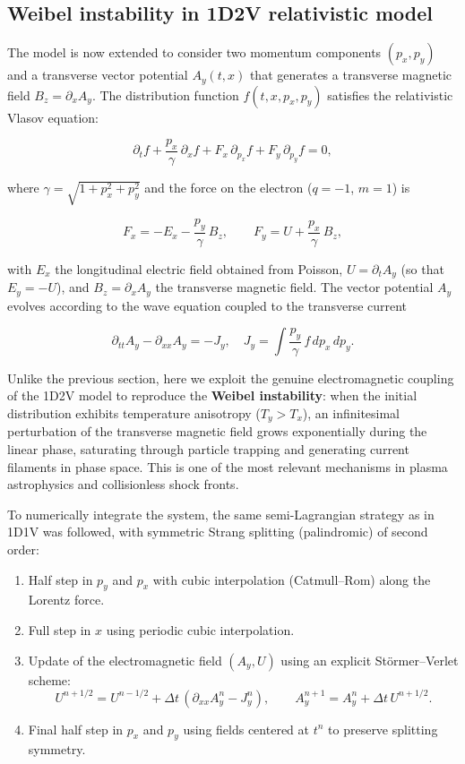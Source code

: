 \documentclass[11pt,a4paper,twoside,pdf]{article}
\numberwithin{equation}{section}
\begin{document}




\subsection{Weibel instability in 1D2V relativistic model}
\label{sec:weibel}

The model is now extended to consider two momentum components $(p_x,p_y)$ and a transverse vector potential $A_y(t,x)$ that generates a transverse magnetic field $B_z = \partial_x A_y$. The distribution function $f(t,x,p_x,p_y)$ satisfies the relativistic Vlasov equation:

\[
\partial_t f + \frac{p_x}{\gamma}\,\partial_x f
+ F_x\,\partial_{p_x} f + F_y\,\partial_{p_y} f = 0,
\]

where $\gamma = \sqrt{1 + p_x^2 + p_y^2}$ and the force on the electron ($q=-1$, $m=1$) is

\[
F_x = -E_x - \frac{p_y}{\gamma}\,B_z, \qquad
F_y = U + \frac{p_x}{\gamma}\,B_z,
\]

with $E_x$ the longitudinal electric field obtained from Poisson, $U = \partial_t A_y$ (so that $E_y = -U$), and $B_z = \partial_x A_y$ the transverse magnetic field. The vector potential $A_y$ evolves according to the wave equation coupled to the transverse current

\[
\partial_{tt} A_y - \partial_{xx} A_y = - J_y,
\quad J_y = \int \frac{p_y}{\gamma}\, f\,dp_x\,dp_y.
\]

Unlike the previous section, here we exploit the genuine electromagnetic coupling of the 1D2V model to reproduce the \textbf{Weibel instability}: when the initial distribution exhibits temperature anisotropy ($T_y > T_x$), an infinitesimal perturbation of the transverse magnetic field grows exponentially during the linear phase, saturating through particle trapping and generating current filaments in phase space. This is one of the most relevant mechanisms in plasma astrophysics and collisionless shock fronts.

To numerically integrate the system, the same semi-Lagrangian strategy as in 1D1V was followed, with symmetric Strang splitting (palindromic) of second order:

\begin{enumerate}
    \item Half step in $p_y$ and $p_x$ with cubic interpolation (Catmull--Rom) along the Lorentz force.
    \item Full step in $x$ using periodic cubic interpolation.
    \item Update of the electromagnetic field $(A_y,U)$ using an explicit Störmer--Verlet scheme:
    \[
    U^{n+1/2} = U^{n-1/2} + \Delta t\,(\partial_{xx}A_y^n - J_y^n),\qquad
    A_y^{n+1} = A_y^n + \Delta t\, U^{n+1/2}.
    \]
    \item Final half step in $p_x$ and $p_y$ using fields centered at $t^n$ to preserve splitting symmetry.
\end{enumerate}
\end{document}
